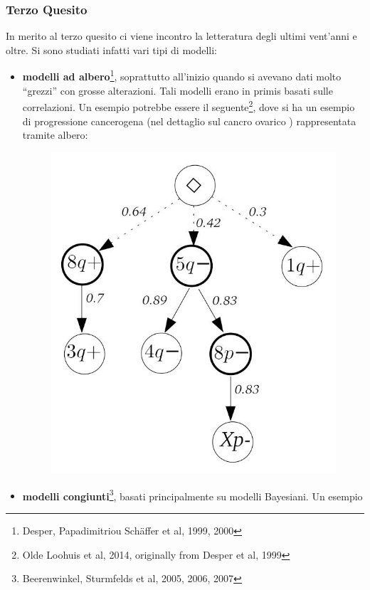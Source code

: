 \documentclass[a4paper,12pt, oneside]{book}
\begin{document}
\subsubsection{Terzo Quesito}
In merito al terzo quesito ci viene incontro la letteratura degli ultimi
vent'anni e oltre. Si sono studiati infatti vari tipi di modelli:
\begin{itemize}
  \item \textbf{modelli ad albero}\footnote{Desper, Papadimitriou Schäffer et
    al, 1999, 2000}, soprattutto all'inizio quando si avevano dati molto
  ``grezzi'' con grosse alterazioni. Tali modelli erano in primis basati sulle
  correlazioni. Un esempio potrebbe essere il seguente\footnote{Olde Loohuis et
    al, 2014, originally from Desper et al, 1999}, dove si ha un esempio di
  progressione cancerogena (nel dettaglio sul cancro ovarico ) rappresentata
  tramite albero:
  \begin{figure}[H]
    \centering
    \includegraphics[scale = 0.25]{img/ovt.jpg}
  \end{figure}
  \item \textbf{modelli congiunti}\footnote{Beerenwinkel, Sturmfelds et al,
    2005, 2006, 2007}, basati principalmente su modelli Bayesiani. Un esempio

\end{itemize}
\end{document}
